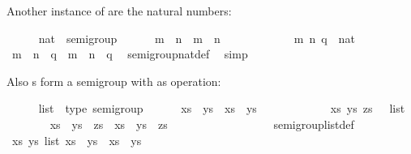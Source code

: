 \begin{isabellebody}
\begin{isamarkuptext}
  Another instance of  are the natural numbers:%
\end{isamarkuptext}%
\isamarkuptrue%
\ \ \ \ \isamarkupfalse%
\ nat\ {\isacharcolon}{\isacharcolon}\ semigroup\isanewline
\ \ \ \ \ \ {\isachardoublequoteopen}m\ {\isasymotimes}\ n\ {\isasymequiv}\ m\ {\isacharplus}\ n{\isachardoublequoteclose}\isanewline
%
\isadelimproof
\ \ \ \ %
\endisadelimproof
%
\isatagproof
{}\isamarkupfalse%
\isanewline
\ \ \ \ \ \ \isamarkupfalse%
\ m\ n\ q\ {\isacharcolon}{\isacharcolon}\ nat\ \isanewline
\ \ \ \ \ \ \isamarkupfalse%
\ {\isachardoublequoteopen}m\ {\isasymotimes}\ n\ {\isasymotimes}\ q\ {\isacharequal}\ m\ {\isasymotimes}\ {\isacharparenleft}n\ {\isasymotimes}\ q{\isacharparenright}{\isachardoublequoteclose}\ \isamarkupfalse%
\ semigroup{\isacharunderscore}nat{\isacharunderscore}def\ \isamarkupfalse%
\ simp\isanewline
\ \ \ \ \isamarkupfalse%
%
\endisatagproof
{\isafoldproof}%
%
\isadelimproof
%
\endisadelimproof
%
\begin{isamarkuptext}%
Also s form a semigroup with  as
  operation:%
\end{isamarkuptext}%
\isamarkuptrue%
\ \ \ \ \isamarkupfalse%
\ list\ {\isacharcolon}{\isacharcolon}\ {\isacharparenleft}type{\isacharparenright}\ semigroup\isanewline
\ \ \ \ \ \ {\isachardoublequoteopen}xs\ {\isasymotimes}\ ys\ {\isasymequiv}\ xs\ {\isacharat}\ ys{\isachardoublequoteclose}\isanewline
%
\isadelimproof
\ \ \ \ %
\endisadelimproof
%
\isatagproof
{}\isamarkupfalse%
\isanewline
\ \ \ \ \ \ \isamarkupfalse%
\ xs\ ys\ zs\ {\isacharcolon}{\isacharcolon}\ {\isachardoublequoteopen}{\isasymalpha}\ list{\isachardoublequoteclose}\isanewline
\ \ \ \ \ \ \isamarkupfalse%
\ {\isachardoublequoteopen}xs\ {\isasymotimes}\ ys\ {\isasymotimes}\ zs\ {\isacharequal}\ xs\ {\isasymotimes}\ {\isacharparenleft}ys\ {\isasymotimes}\ zs{\isacharparenright}{\isachardoublequoteclose}\isanewline
\ \ \ \ \ \ \isamarkupfalse%
\ {\isacharminus}\isanewline
\ \ \ \ \ \ \ \ \isamarkupfalse%
\ semigroup{\isacharunderscore}list{\isacharunderscore}def\ \isamarkupfalse%
\ {\isachardoublequoteopen}{\isasymAnd}xs\ ys{\isasymColon}{\isasymalpha}\ list{\isachardot}\ xs\ {\isasymotimes}\ ys\ {\isasymequiv}\ xs\ {\isacharat}\ ys{\isachardoublequoteclose}\ \isacommand{{\isachardot}}\isamarkupfalse%
\isanewline

\end{isabellebody}
